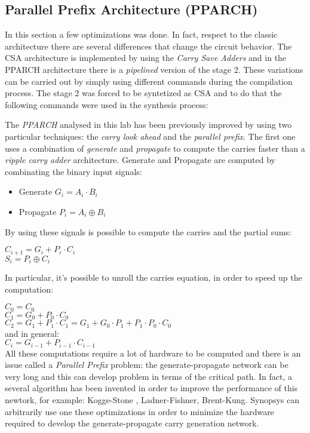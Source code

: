 \subsection{Parallel Prefix Architecture (PPARCH)}

In this section a few optimizations was done. In fact, respect to the classic architecture there are several differences that change the circuit behavior. The CSA architecture is implemented by using the \textit{Carry Save Adders} and in the PPARCH architecture there is a \textit{pipelined} version of the stage 2. These variations can be carried out by simply using different commands during the compilation process. The stage 2 was forced to be syntetized as CSA and to do that the following commands were used in the synthesis process:


The \textit{PPARCH} analysed in this lab has been previously improved by using two particular techniques: the \textit{carry look ahead} and the \textit{parallel prefix}. The first one uses a combination of \textit{generate} and \textit{propagate} to compute the carries faster than a \textit{ripple carry adder} architecture. Generate and Propagate are computed by combinating the binary input signals:
\begin{itemize} 
\item Generate $G_i = A_i \cdot B_i$
\item Propagate $P_i = A_i \oplus B_i$
\end{itemize}
By using these signals is possible to compute the carries and the partial sums:
\begin{center}
$C_{i+1} = G_i + P_i \cdot C_i$ \\
$S_i = P_i \oplus C_i $
\end{center}
In particular, it's possible to unroll the carries equation, in order to speed up the computation:

\noindent
$C_0 = C_0$ \\
$C_1 = G_0 + P_0 \cdot C_0$\\
$C_2 = G_1 + P_1 \cdot C_1 = G_1 + G_0 \cdot P_1  + P_1 \cdot P_0 \cdot C_0$\\
and in general: \\
$C_i = G_{i-1} + P_{i-1} \cdot C_{i-1}$\\
\noindent
All these computations require a lot of hardware to be computed and there is an issue called a \textit{Parallel Prefix} problem: the generate-propagate network can be very long and this can develop problem in terms of the critical path. In fact, a several algorithm has been invented in order to improve the performance of this newtork, for example: Kogge-Stone , Ladner-Fishner, Brent-Kung. Synopsys can arbitrarily use one these optimizations in order to minimize the hardware required to develop the generate-propagate carry generation network.
